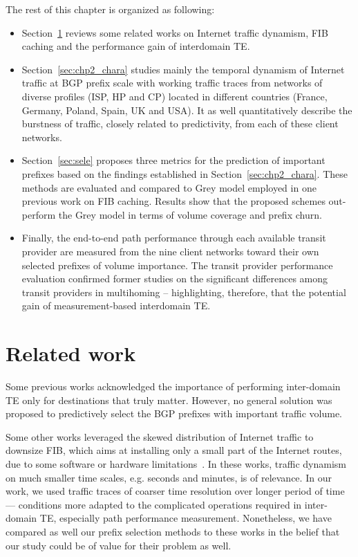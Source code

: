 The rest of this chapter is organized as following:
\begin{itemize}
\item Section~\ref{sec:chp2_related_work} reviews some related works on Internet traffic dynamism, \ac{FIB} caching and the performance gain of interdomain TE.
\item Section~\ref{sec:chp2_chara} studies mainly the temporal dynamism of Internet traffic at BGP prefix scale with working traffic traces from networks of diverse profiles (\ac{ISP}, \ac{HP} and \ac{CP}) located in different countries (France, Germany, Poland, Spain, UK and USA).
It as well quantitatively describe the burstness of traffic, closely related to predictivity, from each of these client networks. 
\item Section~\ref{sec:sele} proposes three metrics for the prediction of important prefixes based on the findings established in Section~\ref{sec:chp2_chara}. 
These methods are evaluated and compared to Grey model employed in one previous work on \ac{FIB} caching. 
Results show that the proposed schemes out-perform the Grey model in terms of volume coverage and prefix churn. 
\item Finally, the end-to-end path performance through each available transit provider are measured from the nine client networks toward their own selected prefixes of volume importance. The transit provider performance evaluation confirmed former studies on the significant differences among transit providers in multihoming -- highlighting, therefore, that the potential gain of measurement-based interdomain \ac{TE}.
\end{itemize}


\section{Related work}
\label{sec:chp2_related_work}
Some previous works \cite{Feamster2003, Akella2008, Goldenberg2004} acknowledged the importance of performing inter-domain TE only for destinations that truly matter.
However, no general solution was proposed to predictively select the BGP prefixes with important traffic volume.

Some other works leveraged the skewed distribution of Internet traffic to downsize \ac{FIB}, 
which aims at installing only a small part of the Internet routes, due to some software or hardware limitations~\cite{Iannone2007, Ballani2009, Kim2009, Zhang2012, Sarrar2012, Liu2015}.
In these works, traffic dynamism on much smaller time scales, e.g. seconds and minutes, is of relevance. 
In our work, we used traffic traces of coarser time resolution over longer period of time --- conditions more adapted to the complicated operations required in inter-domain TE, especially path performance measurement.
Nonetheless, we have compared as well our prefix selection methods to these works in the belief that our study could be of value for their problem as well. 

